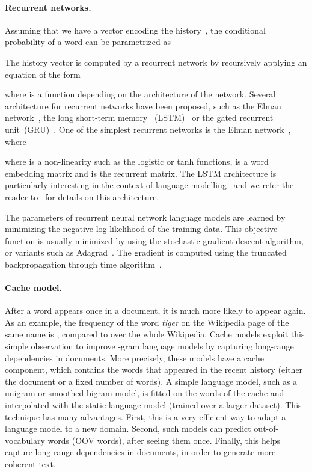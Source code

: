 \documentclass{article} \usepackage{iclr2017_conference,times}
\begin{document}
\paragraph{Recurrent networks.}
Assuming that we have a vector  encoding the history~, the conditional probability of 
a word  can be parametrized as

The history vector  is computed by a recurrent network by recursively applying 
an equation of the form

where  is a function depending on the architecture of the network.
Several architecture for recurrent networks have been proposed, such as the
Elman network~\citep{elman1990finding}, the long short-term memory~
(LSTM)~\citep{hochreiter1997long} or the gated recurrent
unit~(GRU)~\citep{chung2014empirical}.
One of the simplest recurrent networks is the Elman network~\citep{elman1990finding}, where

where  is a non-linearity such as the logistic or tanh functions,  is a word embedding matrix and  is the recurrent matrix.
The LSTM architecture is particularly interesting in the context of language modelling~\citep{jozefowicz2016exploring}
and we refer the reader to~\cite{graves2013speech} for details on this architecture. 

The parameters of recurrent neural network language models are learned by
minimizing the negative log-likelihood of the training data.  This objective
function is usually minimized by using the stochastic gradient descent
algorithm, or variants such as Adagrad~\citep{duchi2011adaptive}.  The gradient
is computed using the truncated backpropagation through time
algorithm~\citep{werbos1990backpropagation,williams1990efficient}.

\paragraph{Cache model.}
After a word appears once in a document, it is much more likely to appear again.
As an example, the frequency of the word \emph{tiger} on the Wikipedia page of the same name is , compared to  over the whole Wikipedia.
Cache models exploit this simple observation to improve -gram language models by capturing long-range dependencies in documents.
More precisely, these models have a cache component, which contains the words that appeared in the recent history (either the document or a fixed number of words).
A simple language model, such as a unigram or smoothed bigram model, is fitted on the words of the cache and interpolated with the static language model (trained over a larger dataset).
This technique has many advantages.
First, this is a very efficient way to adapt a language model to a new domain.
Second, such models can predict out-of-vocabulary words (OOV words), after seeing them once.
Finally, this helps capture long-range dependencies in documents, in order to generate more coherent text.
\end{document}
